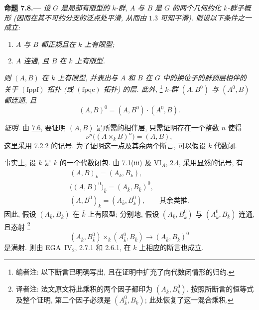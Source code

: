 
\medskip
{}\label{prop:sga3-VIB-7.8}%
\noindent\textbf{命题 7.8.---}
\emph{设 \(G\) 是局部有限型的 \(k\)-群,
\(A\) 与 \(B\) 是 \(G\) 的两个几何约化 \(k\)-群子概形
(因而在其不可约分支的泛点处平滑, 从而由 \(1.3\) 可知平滑).
假设以下条件之一成立:}
\begin{enumerate}
\item[\textup{a)}]\label{cond:sga3-VIB-7.8-a}
  \emph{\(A\) 与 \(B\) 都正规且在 \(k\) 上有限型;}
\item[\textup{b)}]\label{cond:sga3-VIB-7.8-b}
  \emph{\(A\) 连通, 且 \(B\) 在 \(k\) 上有限型.}
\end{enumerate}
\emph{则 \((A,B)\) 在 \(k\) 上有限型,
并表出与 \(A\) 和 \(B\) 在 \(G\) 中的换位子的群预层相伴的
关于 \((\mathrm{fppf})\) 拓扑 (或 \((\mathrm{fpqc})\) 拓扑) 的层.
此外,}%
\footnote{\label{note:sga3-VIB-79}编者注: 以下断言已明确写出,
且在证明中扩充了向代数闭情形的归约.}
\emph{\(k\)-群 \((A,B^0)\) 与 \((A^0,B)\) 都连通, 且}
\label{form:sga3-VIB-7.8-identity-component}%
\[
  (A,B)^0=(A,B^0)\cdot(A^0,B).
\]

\emph{证明.}
由 \hyperref[prop:sga3-VIB-7.6]{7.6},
要证明 \((A,B)\) 是所需的相伴层,
只需证明存在一个整数 \(n\) 使得
\label{form:sga3-VIB-7.8-finite-generation}%
\[
  \nu^n\bigl((A\times_kB)^n\bigr)=(A,B),
\]
这里采用 \hyperref[def:sga3-VIB-7.2.2]{7.2.2} 的记号.
为了证明这一点及其余两个断言, 可以假设 \(k\) 代数闭.

事实上, 设 \(\overline{k}\) 是 \(k\) 的一个代数闭包.
由 \hyperref[concl:sga3-VIB-7.1-iii]{7.1\textup{(iii)}} 及
\hyperref[prop:sga3-VIA-2.4]{VI\(_A\), 2.4},
采用显然的记号, 有
\label{form:sga3-VIB-7.8-base-change}%
\[
\begin{gathered}
  (A,B)_{\overline{k}}
    =(A_{\overline{k}},B_{\overline{k}}),\\
  \bigl((A,B)^0\bigr)_{\overline{k}}
    =(A_{\overline{k}},B_{\overline{k}})^0,\\
  (A,B^0)_{\overline{k}}
    =(A_{\overline{k}},B_{\overline{k}}^0),
  \qquad\text{其余类推.}
\end{gathered}
\]
因此, 假设 \((A_{\overline{k}},B_{\overline{k}})\)
在 \(\overline{k}\) 上有限型;
分别地, 假设 \((A_{\overline{k}},B_{\overline{k}}^0)\)
与 \((A_{\overline{k}}^0,B_{\overline{k}})\) 连通, 且态射\begingroup
\renewcommand{\thefootnote}{\fnsymbol{footnote}}%
\footnote[1]{\label{note:sga3-VIB-7.8-mixed-base-change}
译者注: 法文原文将此乘积的两个因子都印为
\((A_{\overline{k}},B_{\overline{k}}^0)\).
按照所断言的恒等式及整个证明,
第二个因子必须是 \((A_{\overline{k}}^0,B_{\overline{k}})\);
此处恢复了这一混合乘积.}%
\endgroup
\[
  (A_{\overline{k}},B_{\overline{k}}^0)
  \times_{\overline{k}}
  (A_{\overline{k}}^0,B_{\overline{k}})
  \longrightarrow
  (A_{\overline{k}},B_{\overline{k}})^0
\]
是满射. 则由 EGA~IV\(_2\), 2.7.1 和 2.6.1,
在 \(k\) 上相应的断言也成立.

